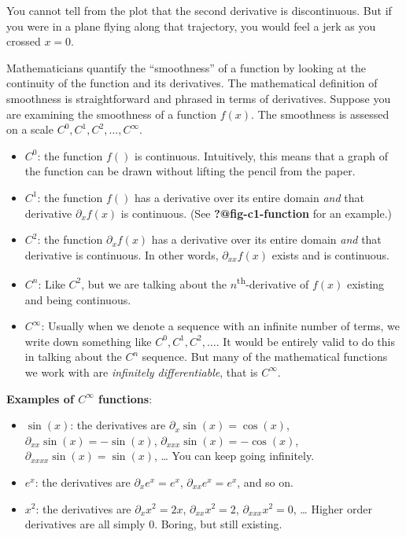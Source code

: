 \documentclass[
  letterpaper,
  DIV=11,
  numbers=noendperiod,
  oneside]{scrreprt}
\providecommand{\tightlist}{%
  \setlength{\itemsep}{0pt}\setlength{\parskip}{0pt}}
\begin{document}
You cannot tell from the plot that the second derivative is
discontinuous. But if you were in a plane flying along that trajectory,
you would feel a jerk as you crossed \(x=0\).

Mathematicians quantify the ``smoothness'' of a function by looking at
the continuity of the function and its derivatives. The mathematical
definition of smoothness is straightforward and phrased in terms of
derivatives. Suppose you are examining the smoothness of a function
\(f(x)\). The smoothness is assessed on a scale
\(C^0, C^1, C^2, \ldots, C^\infty\).

\begin{itemize}
\tightlist
\item
  \(C^0\): the function \(f()\) is continuous. Intuitively, this means
  that a graph of the function can be drawn without lifting the pencil
  from the paper.
\item
  \(C^1\): the function \(f()\) has a derivative over its entire domain
  \emph{and} that derivative \(\partial_x f(x)\) is continuous. (See
  \textbf{?@fig-c1-function} for an example.)
\item
  \(C^2\): the function \(\partial_x f(x)\) has a derivative over its
  entire domain \emph{and} that derivative is continuous. In other
  words, \(\partial_{xx} f(x)\) exists and is continuous.
\item
  \(C^n\): Like \(C^2\), but we are talking about the
  \(n\)\textsuperscript{th}-derivative of \(f(x)\) existing and being
  continuous.
\item
  \(C^\infty\): Usually when we denote a sequence with an infinite
  number of terms, we write down something like
  \(C^0, C^1, C^2, \ldots\). It would be entirely valid to do this in
  talking about the \(C^n\) sequence. But many of the mathematical
  functions we work with are \emph{infinitely differentiable}, that is
  \(C^\infty\).
\end{itemize}

\textbf{Examples of \(C^\infty\) functions}:

\begin{itemize}
\item
  \(\sin(x)\): the derivatives are \(\partial_x \sin(x) = \cos(x)\),
  \(\partial_{xx} \sin(x) = -\sin(x)\),
  \(\partial_{xxx} \sin(x) =-\cos(x)\),
  \(\partial_{xxxx} \sin(x) =\sin(x)\), \ldots{} You can keep going
  infinitely.
\item
  \(e^x\): the derivatives are \(\partial_x e^x = e^x\),
  \(\partial_{xx} e^x = e^x\), and so on.
\item
  \(x^2\): the derivatives are \(\partial_x x^2 = 2 x\),
  \(\partial_{xx} x^2 = 2\), \(\partial_{xxx} x^2 = 0\), \ldots{} Higher
  order derivatives are all simply 0. Boring, but still existing.
\end{itemize}
\end{document}
